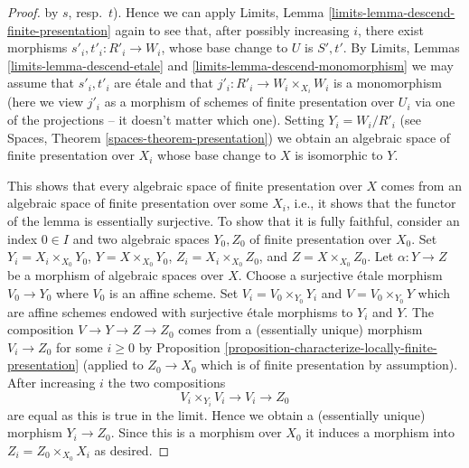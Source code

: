 \begin{proof}
by $s$, resp.\ $t$). Hence we can apply
Limits, Lemma \ref{limits-lemma-descend-finite-presentation}
again to see that, after possibly increasing $i$, there exist
morphisms $s'_i, t'_i : R'_i \to W_i$, whose base change to $U$
is $S', t'$. By Limits, Lemmas \ref{limits-lemma-descend-etale} and
\ref{limits-lemma-descend-monomorphism}
we may assume that $s'_i, t'_i$ are \'etale and that
$j'_i : R'_i \to W_i \times_{X_i} W_i$ is a monomorphism (here we
view $j'_i$ as a morphism of schemes of finite presentation over $U_i$ via
one of the projections -- it doesn't matter which one). Setting
$Y_i = W_i/R'_i$ (see Spaces, Theorem \ref{spaces-theorem-presentation})
we obtain an algebraic space of finite presentation
over $X_i$ whose base change to $X$ is isomorphic to $Y$.

\medskip\noindent
This shows that every algebraic space of finite presentation over $X$ comes
from an algebraic space of finite presentation over some $X_i$, i.e.,
it shows that the functor of the lemma is essentially surjective. To
show that it is fully faithful, consider an index $0 \in I$ and two
algebraic spaces $Y_0, Z_0$ of finite presentation over $X_0$.
Set $Y_i = X_i \times_{X_0} Y_0$, $Y = X \times_{X_0} Y_0$,
$Z_i = X_i \times_{X_0} Z_0$, and $Z = X \times_{X_0} Z_0$. Let
$\alpha : Y \to Z$ be a morphism of algebraic spaces over $X$.
Choose a surjective \'etale morphism $V_0 \to Y_0$ where $V_0$ is
an affine scheme. Set $V_i = V_0 \times_{Y_0} Y_i$ and
$V = V_0 \times_{Y_0} Y$ which are affine schemes endowed with
surjective \'etale morphisms to $Y_i$ and $Y$. The composition
$V \to Y \to Z \to Z_0$ comes from a (essentially unique) morphism
$V_i \to Z_0$ for some $i \geq 0$ by
Proposition \ref{proposition-characterize-locally-finite-presentation}
(applied to $Z_0 \to X_0$ which is of finite presentation by assumption).
After increasing $i$ the two compositions
$$
V_i \times_{Y_i} V_i \to V_i \to Z_0
$$
are equal as this is true in the limit. Hence we obtain a (essentially unique)
morphism $Y_i \to Z_0$. Since this is a morphism over $X_0$
it induces a morphism into $Z_i = Z_0 \times_{X_0} X_i$ as desired.
\end{proof}
